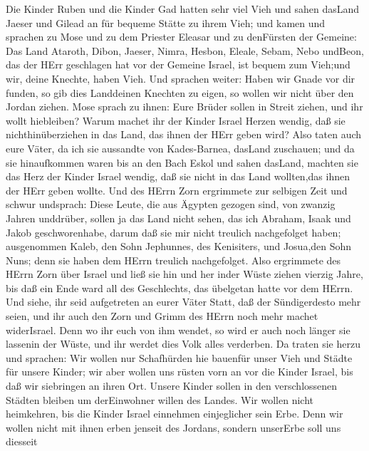  Die Kinder Ruben und die Kinder Gad hatten sehr viel Vieh
und sahen dasLand Jaeser und Gilead an für bequeme Stätte zu ihrem Vieh;
 und kamen und sprachen zu Mose und zu dem Priester Eleasar
und zu denFürsten der Gemeine:  Das Land Ataroth, Dibon,
Jaeser, Nimra, Hesbon, Eleale, Sebam, Nebo undBeon,  das der
HErr geschlagen hat vor der Gemeine Israel, ist bequem zum Vieh;und wir,
deine Knechte, haben Vieh.  Und sprachen weiter: Haben wir
Gnade vor dir funden, so gib dies Landdeinen Knechten zu eigen, so
wollen wir nicht über den Jordan ziehen.  Mose sprach zu
ihnen: Eure Brüder sollen in Streit ziehen, und ihr wollt hiebleiben?
 Warum machet ihr der Kinder Israel Herzen wendig, daß sie
nichthinüberziehen in das Land, das ihnen der HErr geben wird?
 Also taten auch eure Väter, da ich sie aussandte von
Kades-Barnea, dasLand zuschauen;  und da sie hinaufkommen
waren bis an den Bach Eskol und sahen dasLand, machten sie das Herz der
Kinder Israel wendig, daß sie nicht in das Land wollten,das ihnen der
HErr geben wollte.  Und des HErrn Zorn ergrimmete zur
selbigen Zeit und schwur undsprach:  Diese Leute, die aus
Ägypten gezogen sind, von zwanzig Jahren unddrüber, sollen ja das Land
nicht sehen, das ich Abraham, Isaak und Jakob geschworenhabe, darum daß
sie mir nicht treulich nachgefolget haben;  ausgenommen
Kaleb, den Sohn Jephunnes, des Kenisiters, und Josua,den Sohn Nuns; denn
sie haben dem HErrn treulich nachgefolget.  Also ergrimmete
des HErrn Zorn über Israel und ließ sie hin und her inder Wüste ziehen
vierzig Jahre, bis daß ein Ende ward all des Geschlechts, das übelgetan
hatte vor dem HErrn.  Und siehe, ihr seid aufgetreten an
eurer Väter Statt, daß der Sündigerdesto mehr seien, und ihr auch den
Zorn und Grimm des HErrn noch mehr machet widerIsrael. 
Denn wo ihr euch von ihm wendet, so wird er auch noch länger sie
lassenin der Wüste, und ihr werdet dies Volk alles verderben.
 Da traten sie herzu und sprachen: Wir wollen nur
Schafhürden hie bauenfür unser Vieh und Städte für unsere Kinder;
 wir aber wollen uns rüsten vorn an vor die Kinder Israel,
bis daß wir siebringen an ihren Ort. Unsere Kinder sollen in den
verschlossenen Städten bleiben um derEinwohner willen des Landes.
 Wir wollen nicht heimkehren, bis die Kinder Israel
einnehmen einjeglicher sein Erbe.  Denn wir wollen nicht
mit ihnen erben jenseit des Jordans, sondern unserErbe soll uns diesseit
